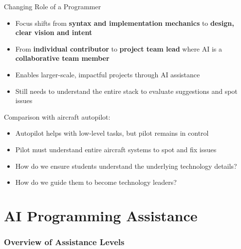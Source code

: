 \documentclass[xcolor=dvipsnames, aspectratio=169]{beamer}
\begin{document}
\begin{frame}{Changing Role of a Programmer}
  \begin{itemize}
    \item Focus shifts from \textbf{syntax and implementation mechanics} to \textbf{design, clear vision and intent}
    \item From \textbf{individual contributor} to \textbf{project team lead} where AI is a \textbf{collaborative team member}
    \item Enables larger-scale, impactful projects through AI assistance
    \item Still needs to understand the entire stack to evaluate suggestions and spot issues
  \end{itemize}
  
  \begin{alertbox}
    Comparison with aircraft autopilot:
    \begin{itemize}
      \item Autopilot helps with low-level tasks, but pilot remains in control
      \item Pilot must understand entire aircraft systems to spot and fix issues
    \end{itemize}
  \end{alertbox}
  \begin{alertbox}
    \begin{itemize}
      \item How do we ensure students understand the underlying technology details?
      \item How do we guide them to become technology leaders?
    \end{itemize}
  \end{alertbox}
\end{frame}


\part[AI Programming Assistance]{AI Programming Assistance}
\section{Overview of Assistance Levels}
\end{document}
